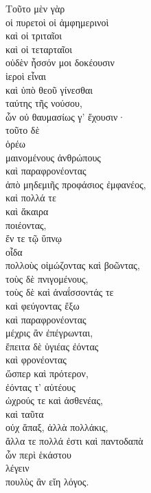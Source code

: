 {\large
\begin{greek}
\noindent Τοῦτο μὲν γὰρ \\
οἱ πυρετοὶ οἱ ἀμφημερινοὶ \\
\tabto{2em} καὶ οἱ τριταῖοι \\
\tabto{2em} καὶ οἱ τεταρταῖοι \\
οὐδὲν ἧσσόν μοι δοκέουσιν \\
\tabto{2em} ἱεροὶ εἶναι \\
καὶ ὑπὸ θεοῦ γίνεσθαι \\
\tabto{2em} ταύτης τῆς νούσου, \\
ὧν οὐ θαυμασίως γ' ἔχουσιν· \\
τοῦτο δὲ \\
ὁρέω \\
μαινομένους ἀνθρώπους \\
καὶ παραφρονέοντας \\
\tabto{2em} ἀπὸ μηδεμιῆς προφάσιος ἐμφανέος, \\
καὶ πολλά τε \\
καὶ ἄκαιρα \\
\tabto{2em} ποιέοντας, \\
ἔν τε τῷ ὕπνῳ \\
οἶδα \\
\tabto{2em} πολλοὺς οἰμώζοντας καὶ βοῶντας, \\
\tabto{2em} τοὺς δὲ πνιγομένους, \\
\tabto{2em} τοὺς δὲ καὶ ἀναΐσσοντάς τε\\
\tabto{2em} καὶ φεύγοντας ἔξω \\
\tabto{2em} καὶ παραφρονέοντας \\
\tabto{2em} \tabto{2em} μέχρις ἂν ἐπέγρωνται, \\
ἔπειτα δὲ ὑγιέας ἐόντας \\
καὶ φρονέοντας \\
\tabto{2em} ὥσπερ καὶ πρότερον, \\
ἐόντας τ' αὐτέους \\
\tabto{2em} ὠχρούς τε καὶ ἀσθενέας, \\
καὶ ταῦτα \\
\tabto{2em} οὐχ ἅπαξ, ἀλλὰ πολλάκις,\\
ἄλλα τε πολλά ἐστι καὶ παντοδαπὰ\\
\tabto{2em} ὧν περὶ ἑκάστου \\
\tabto{2em} \tabto{2em} λέγειν \\
\tabto{2em} \tabto{2em} πουλὺς ἂν εἴη λόγος.\\

\end{greek}
}

